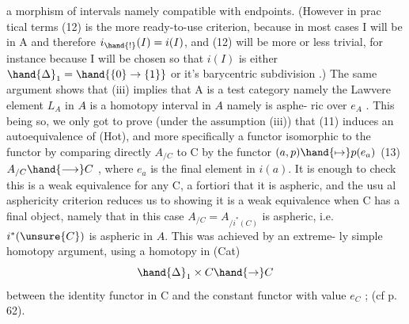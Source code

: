 
a morphism of intervals\hand{,} namely compatible with endpoints. (However in prac\unsure{-}%
tical terms (12) is the more ready-to-use criterion,  because in most
cases I will be in A and therefore  $i_{\hand{!}}(I) = i(I)$,  and (12) will be more
or less trivial,  for instance because I will be chosen so that $i(I)$ is
either $\hand{\Delta}_1 = \hand{\{0\}\to\{1\}}$  or it's barycentric subdivision .)  The
same argument shows that (iii) implies that A is a test category\hand{,} namely
the Lawvere element $L_A$ in $A\hat{}$ is a homotopy interval in $A\hat{}$\hand{,} namely is asphe-%
ric over $e_{A\hat{}}$ .  This being so,  we  only got to
prove (under the assumption (iii))  that (11) induces an autoequivalence
of (Hot),  and more specifically a functor isomorphic to the 
functor  by comparing directly $A_{/C}$ to C  by the functor  $(a,p)\hand{\mapsto} p(e_a)$
(13) \qquad $A_{/C} \hand{\longrightarrow} C$ ,
where  $e_a$ is the final element in $i(a)$.  It is enough to check this is a
weak equivalence for any C,  a fortiori that it is aspheric,  and the usu%
al asphericity criterion reduces us to showing it is a weak equivalence
when C has a final object,  namely that in this case  $A_{/C} = A_{/i^*(C)}$  is
aspheric,  i.e. $i^*(\unsure{C})$ is aspheric in $A\hat{}$.  This was achieved by an extreme-%
ly simple homotopy argument,  using a homotopy  in (Cat)
\[ \hand{\Delta}_1 \times C \hand{\to} C \]
between the identity functor in C and the constant functor with value $e_C$ ;
(cf p. 62).

